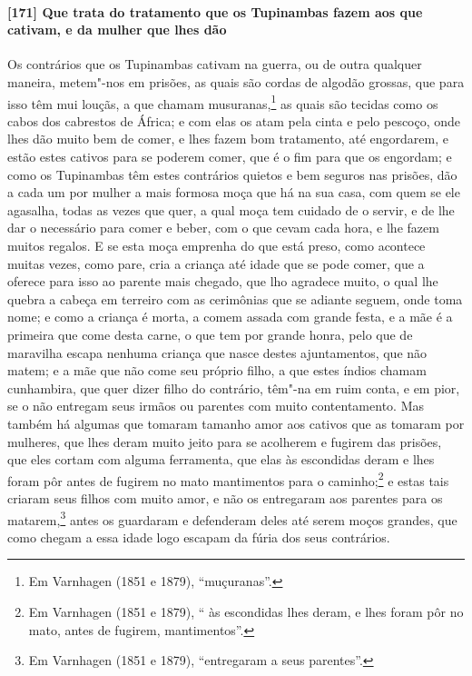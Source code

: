 \begin{linenumbers}
\paragraph{[171] Que trata do tratamento que os Tupinambas fazem aos que cativam, e da
mulher que lhes dão}\quad
Os contrários que os Tupinambas cativam na guerra, ou de outra qualquer maneira, metem"-nos
em prisões, as quais são cordas de algodão grossas, que para isso têm mui louçãs, a que
chamam musuranas,\footnote{ Em Varnhagen (1851 e 1879), ``muçuranas''.} as quais são
tecidas como os cabos dos cabrestos de África; e com elas os atam pela cinta e pelo
pescoço, onde lhes dão muito bem de comer, e lhes fazem bom tratamento, até engordarem, e
estão estes cativos para se poderem comer, que é o fim para que os engordam; e como os
Tupinambas têm estes contrários quietos e bem seguros nas prisões, dão a cada um por
mulher a mais formosa moça que há na sua casa, com quem se ele agasalha, todas as vezes
que quer, a qual moça tem cuidado de o servir, e de lhe dar o necessário para comer e
beber, com o que cevam cada hora, e lhe fazem muitos regalos. E se esta moça emprenha do
que está preso, como acontece muitas vezes, como pare, cria a criança até idade que se
pode comer, que a oferece para isso ao parente mais chegado, que lho agradece muito, o
qual lhe quebra a cabeça em terreiro com as cerimônias que se adiante seguem, onde toma
nome; e como a criança é morta, a comem assada com grande festa, e a mãe é a primeira que
come desta carne, o que tem por grande honra, pelo que de maravilha escapa nenhuma criança
que nasce destes ajuntamentos, que não matem; e a mãe que não come seu próprio filho, a
que estes índios chamam cunhambira, que quer dizer filho do contrário, têm"-na em ruim
conta, e em pior, se o não entregam seus irmãos ou parentes com muito contentamento. Mas
também há algumas que tomaram tamanho amor aos cativos que as tomaram por mulheres, que
lhes deram muito jeito para se acolherem e fugirem das prisões, que eles cortam com alguma
ferramenta, que elas às escondidas deram e lhes foram pôr antes de fugirem no mato
mantimentos para o caminho;\footnote{ Em Varnhagen (1851 e 1879), `` às escondidas lhes
deram, e lhes foram pôr no mato, antes de fugirem, mantimentos''.} e estas tais criaram
seus filhos com muito amor, e não os entregaram aos parentes para os matarem,\footnote{ Em
Varnhagen (1851 e 1879), ``entregaram a seus parentes''.} antes os guardaram e defenderam
deles até serem moços grandes, que como chegam a essa idade logo escapam da fúria dos seus
contrários.


\end{linenumbers}
